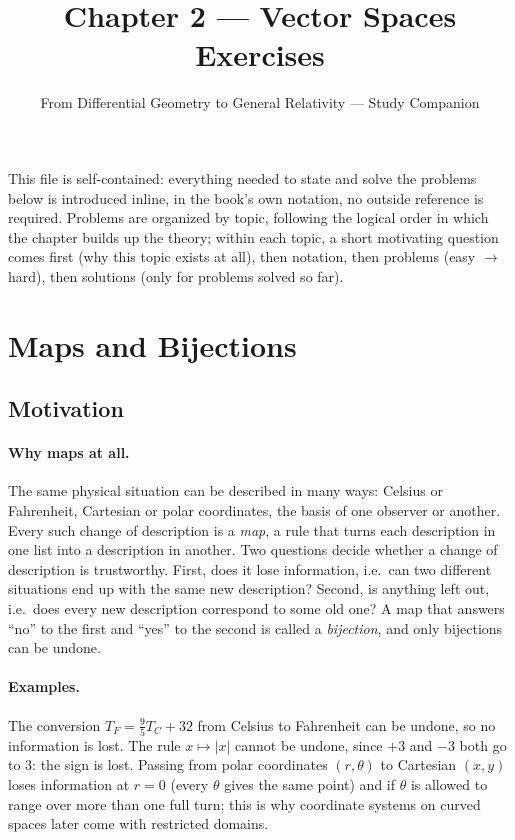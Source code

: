 \documentclass[11pt]{article}
\title{Chapter 2 --- Vector Spaces\\ \large Exercises}
\author{From Differential Geometry to General Relativity --- Study Companion}
\date{}
\begin{document}
\maketitle

\noindent This file is self-contained: everything needed to state and solve
the problems below is introduced inline, in the book's own notation, no
outside reference is required. Problems are organized by topic, following
the logical order in which the chapter builds up the theory; within each
topic, a short motivating question comes first (why this topic exists at
all), then notation, then problems (easy $\to$ hard), then solutions (only
for problems solved so far).

\section{Maps and Bijections}

\subsection*{Motivation}

\paragraph{Why maps at all.}
The same physical situation can be described in many ways: Celsius or Fahrenheit, Cartesian or polar coordinates, the basis of one observer or another. Every such change of description is a \emph{map}, a rule that turns each description in one list into a description in another. Two questions decide whether a change of description is trustworthy. First, does it lose information, i.e.\ can two different situations end up with the same new description? Second, is anything left out, i.e.\ does every new description correspond to some old one? A map that answers ``no'' to the first and ``yes'' to the second is called a \emph{bijection}, and only bijections can be undone.

\paragraph{Examples.}
The conversion $T_F=\tfrac95T_C+32$ from Celsius to Fahrenheit can be undone, so no information is lost. The rule $x\mapsto|x|$ cannot be undone, since $+3$ and $-3$ both go to $3$: the sign is lost. Passing from polar coordinates $(r,\theta)$ to Cartesian $(x,y)$ loses information at $r=0$ (every $\theta$ gives the same point) and if $\theta$ is allowed to range over more than one full turn; this is why coordinate systems on curved spaces later come with restricted domains.
\end{document}
